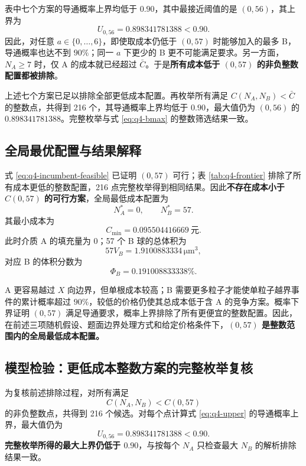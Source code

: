 \documentclass[withoutpreface,bwprint]{cumcmthesis}
\begin{document}
表中七个方案的导通概率上界均低于 $0.90$，其中最接近阈值的是 $(0,56)$，其上界为
\[
U_{0,56}=0.898341781388<0.90.
\]
因此，对任意 $a\in\{0,\ldots,6\}$，即使取成本仍低于 $(0,57)$ 时能够加入的最多 B，导通概率也达不到 $90\%$；同一 $a$ 下更少的 B 更不可能满足要求。另一方面，$N_A\ge7$ 时，仅 A 的成本就已经超过 $\bar C$。于是\textbf{所有成本低于 $(0,57)$ 的非负整数配置都被排除}。

上述七个方案已足以排除全部更低成本配置。再枚举所有满足 $C(N_A,N_B)<\bar C$ 的整数点，共得到 216 个，其导通概率上界均低于 $0.90$，最大值仍为 $(0,56)$ 的 $0.898341781388$。完整枚举与式 \eqref{eq:q4-bmax} 的整数筛选结果一致。

\subsection{全局最优配置与结果解释}

式 \eqref{eq:q4-incumbent-feasible} 已证明 $(0,57)$ 可行；表 \ref{tab:q4-frontier} 排除了所有成本更低的整数配置，216 点完整枚举得到相同结果。因此\textbf{不存在成本小于 $C(0,57)$ 的可行方案}，全局最低成本配置为
\begin{equation}
\boxed{N_A^*=0,\qquad N_B^*=57}.
\label{eq:q4-optimum}
\end{equation}
其最小成本为
\begin{equation}
\boxed{C_{\min}=0.095504416669\ \text{元}}.
\end{equation}
此时介质 A 的填充量为 0；57 个 B 球的总体积为
\[
57V_B=1.9100883334\,\mathrm{\mu m^3},
\]
对应 B 的体积分数为
\begin{equation}
\boxed{\Phi_B=0.191008833338\%}.
\end{equation}

A 更容易越过 $X$ 向边界，但单根成本较高；B 需要更多粒子才能使单粒子越界事件的累计概率超过 $90\%$，较低的价格仍使其总成本低于含 A 的竞争方案。概率下界证明 $(0,57)$ 满足导通要求，概率上界排除了所有更便宜的整数配置。因此，在前述三项随机假设、题面边界处理方式和给定价格条件下，\textbf{$(0,57)$ 是整数范围内的全局最低成本配置。}

\subsection{模型检验：更低成本整数方案的完整枚举复核}

为复核前述排除过程，对所有满足
\[
C(N_A,N_B)<C(0,57)
\]
的非负整数点，共得到 216 个候选。对每个点计算式 \eqref{eq:q4-upper} 的导通概率上界，最大值仍为
\[
U_{0,56}=0.898341781388<0.90.
\]
\textbf{完整枚举所得的最大上界仍低于 $0.90$}，与按每个 $N_A$ 只检查最大 $N_B$ 的解析排除结果一致。
\end{document}
